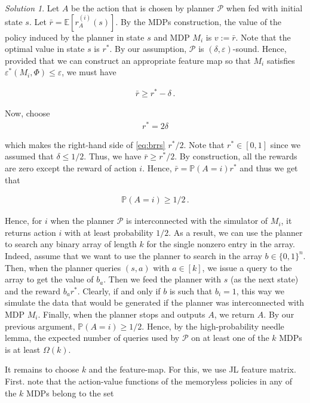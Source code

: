 \documentclass{article}
\DeclareMathOperator*{\1}{\mathbbm{1}}
\newcommand{\0}{\mathbf{0}}
\theoremstyle{definition}
\theoremstyle{remark}
\newtheorem*{solution*}{Solution}
\theoremstyle{theorem}
\begin{document}
\begin{solution*}
Let $A$ be the action that is chosen by planner $\mathcal{P}$ when fed with initial state $s$. 
Let $\bar r = \mathbb{E}[r_A^{(i)}(s)]$.
By the MDPs construction, the value of the policy induced by the planner in state $s$ and MDP $M_i$ is $v := \bar r$.
Note that the optimal value in state $s$ is $r^*$.
By our assumption, $\mathcal{P}$ is $(\delta,\varepsilon)$-sound.
Hence, provided that we can construct an appropriate feature map so that $M_i$ satisfies $\varepsilon^*(M_i,\Phi)\le \varepsilon$, we must have

\begin{align}
\bar r \ge r^*-\delta\,.
\label{eq:brrs}
\end{align}

Now, choose
\begin{align*}
r^* = 2 \delta
\end{align*}

which makes the right-hand side of \eqref{eq:brrs} $r^*/2$. Note that $r^*\in [0,1]$ 
since we assumed that $\delta\le 1/2$.
Thus, we have $\bar r \ge r^*/2$. By construction, all the rewards are zero except the reward of action $i$. Hence, $\bar r = \mathbb{P}(A=i) r^*$ and thus we get that

\begin{align*}
\mathbb{P}(A=i)\ge 1/2\,.
\end{align*}

Hence, for $i$ when the planner $\mathcal{P}$
is interconnected with the simulator of $M_i$, it
returns action $i$ with at least probability $1/2$.
As a result, we can use the planner to search any binary array of length $k$ for the single nonzero entry in the array. Indeed, assume that we want to use the planner to search in the array $b\in \{0,1\}^n$.
Then, when the planner queries $(s,a)$ with $a\in [k]$,
we issue a query to the array to get the value of $b_a$. Then we feed the planner
with $s$ (as the next state) and the reward $b_a r^*$. Clearly,
if and only if $b$ is such that $b_i=1$,
this way we simulate the data that would be generated if the planner was interconnected with MDP $M_i$. Finally, when the planner stops and outputs $A$, we return $A$. By our previous argument, $\mathbb{P}(A=i)\ge 1/2$. Hence, by the high-probability needle lemma, the expected number of queries used by $\mathcal{P}$ on at least one of the $k$ MDPs is at least $\Omega(k)$.

It remains to choose $k$ and the feature-map. For this, we use JL feature matrix.
First. note that the action-value functions of the memoryless policies in any of the $k$ MDPs belong to the set


\end{solution*}
\end{document}
